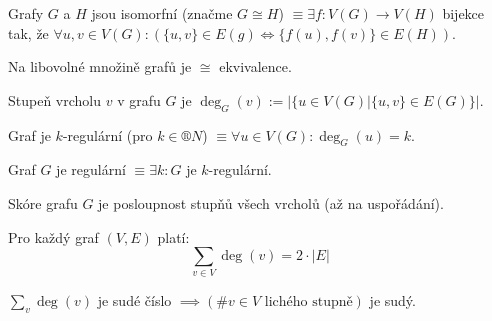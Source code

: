 \documentclass[12pt]{article}					%
\begin{document}
    \begin{definice}
        Grafy $G$ a $H$ jsou isomorfní (značme $G \cong H$) $≡ \exists f: V(G) \rightarrow V(H)$ bijekce tak, že $\forall u, v \in V(G):(\{u, v\} \in E(g) \Leftrightarrow \{f(u), f(v)\} \in E(H))$.
    \end{definice}

    \begin{poznamka}[K nahlédnutí]
        Na libovolné množině grafů je $\cong$ ekvivalence.
    \end{poznamka}

    \begin{definice}
        Stupeň vrcholu $v$ v grafu $G$ je $\deg_G(v) := \left|\{u \in V(G)|\{u, v\} \in E(G)\}\right|$.
    \end{definice}

    \begin{definice}
        Graf je $k$-regulární (pro $k \in ®N$) $≡ \forall u \in V(G): \deg_G(u) = k$.

        Graf $G$ je regulární $≡ \exists k: G$ je $k$-regulární.
    \end{definice}

    \begin{definice}
        Skóre grafu $G$ je posloupnost stupňů všech vrcholů (až na uspořádání).
    \end{definice}

    \begin{veta}
        Pro každý graf $(V, E)$ platí:
        $$ \sum_{v\in V} \deg(v) = 2·|E| $$ 
    \end{veta}

    \begin{dusledek}
        $\sum_v \deg(v)$ je sudé číslo $\implies (\#v\in V \text{ lichého stupně})$ je sudý.
    \end{dusledek}
\end{document}

